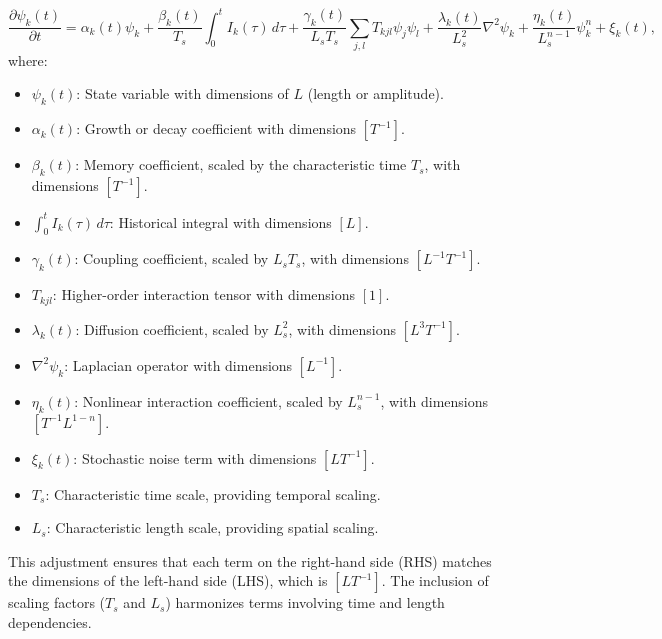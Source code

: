 \documentclass{article}
\theoremstyle{plain}
\begin{document}
\begin{equation}
\frac{\partial \psi_k(t)}{\partial t} = \alpha_k(t) \psi_k + \frac{\beta_k(t)}{T_s} \int_0^t I_k(\tau) \, d\tau + \frac{\gamma_k(t)}{L_s T_s} \sum_{j,l} T_{kjl} \psi_j \psi_l + \frac{\lambda_k(t)}{L_s^2} \nabla^2 \psi_k + \frac{\eta_k(t)}{L_s^{n-1}} \psi_k^n + \xi_k(t),
\end{equation}
where:
\begin{itemize}
    \item \(\psi_k(t)\): State variable with dimensions of \(L\) (length or amplitude).
    \item \(\alpha_k(t)\): Growth or decay coefficient with dimensions \([T^{-1}]\).
    \item \(\beta_k(t)\): Memory coefficient, scaled by the characteristic time \(T_s\), with dimensions \([T^{-1}]\).
    \item \(\int_0^t I_k(\tau) \, d\tau\): Historical integral with dimensions \([L]\).
    \item \(\gamma_k(t)\): Coupling coefficient, scaled by \(L_s T_s\), with dimensions \([L^{-1} T^{-1}]\).
    \item \(T_{kjl}\): Higher-order interaction tensor with dimensions \([1]\).
    \item \(\lambda_k(t)\): Diffusion coefficient, scaled by \(L_s^2\), with dimensions \([L^3 T^{-1}]\).
    \item \(\nabla^2 \psi_k\): Laplacian operator with dimensions \([L^{-1}]\).
    \item \(\eta_k(t)\): Nonlinear interaction coefficient, scaled by \(L_s^{n-1}\), with dimensions \([T^{-1} L^{1-n}]\).
    \item \(\xi_k(t)\): Stochastic noise term with dimensions \([L T^{-1}]\).
    \item \(T_s\): Characteristic time scale, providing temporal scaling.
    \item \(L_s\): Characteristic length scale, providing spatial scaling.
\end{itemize}

This adjustment ensures that each term on the right-hand side (RHS) matches the dimensions of the left-hand side (LHS), which is \([L T^{-1}]\). The inclusion of scaling factors (\(T_s\) and \(L_s\)) harmonizes terms involving time and length dependencies.
\end{document}
